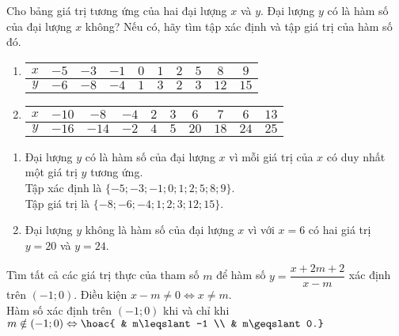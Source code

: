 \begin{vd}%
	Cho bảng giá trị tương ứng của hai đại lượng $x$ và $y$. Đại lượng $y$ có là hàm số của đại lượng $x$ không? Nếu có, hãy tìm tập xác định và tập giá trị của hàm số đó.
	\begin{enumerate}
		\item
		      \begin{tabular}{|c|c|c|c|c|c|c|c|c|c|}
			      \hline
			      $x$ & $-5$ & $-3$ & $-1$ & $0$ & $1$ & $2$ & $5$ & $8$  & $9$  \\
			      \hline
			      $y$ & $-6$ & $-8$ & $-4$ & $1$ & $3$ & $2$ & $3$ & $12$ & $15$ \\
			      \hline
		      \end{tabular}
		\item
		      \begin{tabular}{|c|c|c|c|c|c|c|c|c|c|}
			      \hline
			      $x$ & $-10$ & $-8$  & $-4$ & $2$ & $3$ & $6$  & $7$  & $6$  & $13$ \\
			      \hline
			      $y$ & $-16$ & $-14$ & $-2$ & $4$ & $5$ & $20$ & $18$ & $24$ & $25$ \\
			      \hline
		      \end{tabular}
	\end{enumerate}
	\loigiai
	{
		\begin{enumerate}
			\item Đại lượng $y$ có là hàm số của đại lượng $x$ vì mỗi giá trị của $x$ có duy nhất một giá trị $y$ tương ứng. \\
			      Tập xác định là $\{-5;-3;-1;0;1;2;5;8;9\}$. \\
			      Tập giá trị là $\{-8;-6;-4;1;2;3;12;15\}$.
			\item Đại lượng $y$ không là hàm số của đại lượng $x$ vì với $x=6$ có hai giá trị $y=20$ và $y=24$.
		\end{enumerate}
	}
\end{vd}

\begin{vd}%
	Tìm tất cả các giá trị thực của tham số $m$ để hàm số $y=\dfrac{x+2m+2}{x-m}$ xác định trên $(-1;0)$.
	\loigiai
	{
		Điều kiện $x-m\neq0 \Leftrightarrow x\neq m$. \\
		Hàm số xác định trên $(-1;0)$ khi và chỉ khi $m\notin(-1;0) \Leftrightarrow \hoac{ & m\leqslant-1 \\ & m\geqslant0.}$
	}
\end{vd}


